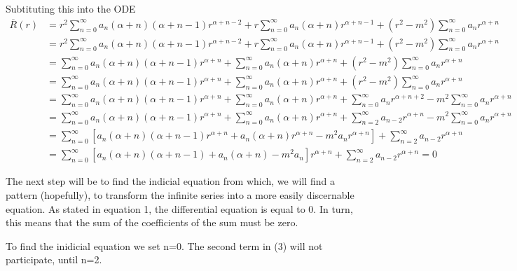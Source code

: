 \documentclass[11pt]{article}
\begin{document}
Subtituting this into the ODE \begin{equation}
\begin{split}
\overline{R}(r) &= r^2 \sum_{n=0}^{\infty} a_{n} (\alpha + n) (\alpha + n - 1) r^{\alpha + n - 2} + r \sum_{n=0}^{\infty} a_{n} (\alpha + n) r^{\alpha + n - 1} + (r^2 - m^2)\sum_{n=0}^{\infty} a_n r^{\alpha + n} \\
&= r^2 \sum_{n=0}^{\infty} a_n (\alpha + n) (\alpha + n - 1) r^{\alpha + n - 2} + r \sum_{n=0}^{\infty} a_{n} (\alpha + n) r^{\alpha + n - 1} + (r^2 - m^2)\sum_{n=0}^{\infty} a_n r^{\alpha + n} \\
&= \sum_{n=0}^{\infty} a_{n} (\alpha + n) (\alpha + n - 1) r^{\alpha + n} + \sum_{n=0}^{\infty} a_{n} (\alpha + n) r^{\alpha + n} + (r^2 - m^2)\sum_{n=0}^{\infty} a_n r^{\alpha + n} \\
&= \sum_{n=0}^{\infty} a_{n} (\alpha + n) (\alpha + n - 1) r^{\alpha + n} + \sum_{n=0}^{\infty} a_{n} (\alpha + n) r^{\alpha + n} + (r^2 - m^2)\sum_{n=0}^{\infty} a_n r^{\alpha + n} \\
&= \sum_{n=0}^{\infty} a_{n} (\alpha + n) (\alpha + n - 1) r^{\alpha + n} + \sum_{n=0}^{\infty} a_{n} (\alpha + n) r^{\alpha + n} + \sum_{n=0}^{\infty}{a_n r^{\alpha + n + 2}} - m^2 \sum_{n=0}^{\infty}{a_n r^{\alpha + n}}\\
&= \sum_{n=0}^{\infty} a_{n} (\alpha + n) (\alpha + n - 1) r^{\alpha + n} + \sum_{n=0}^{\infty} a_{n} (\alpha + n) r^{\alpha + n} + \sum_{n=2}^{\infty}{a_{n-2} r^{\alpha + n}} - m^2 \sum_{n=0}^{\infty}{a_n r^{\alpha + n}}\\
&= \sum_{n=0}^{\infty} \left[ a_{n} (\alpha + n) (\alpha + n - 1) r^{\alpha + n} +
a_{n} (\alpha + n) r^{\alpha + n} - m^2 a_n r^{\alpha + n} \right] + \sum_{n=2}^{\infty}{a_{n-2} r^{\alpha + n}} \\ 
&= \sum_{n=0}^{\infty} \left[ a_{n} (\alpha + n) (\alpha + n - 1)  +
a_{n} (\alpha + n) - m^2 a_n  \right] r^{\alpha + n} + \sum_{n=2}^{\infty}{a_{n-2} r^{\alpha + n}} = 0
\end{split}
\end{equation}

The next step will be to find the indicial equation from which, we will
find a pattern (hopefully), to transform the infinite series into a more
easily discernable equation. As stated in equation 1, the differential
equation is equal to 0. In turn, this means that the sum of the
coefficients of the sum must be zero.

To find the inidicial equation we set n=0. The second term in (3) will
not participate, until n=2.
\end{document}
